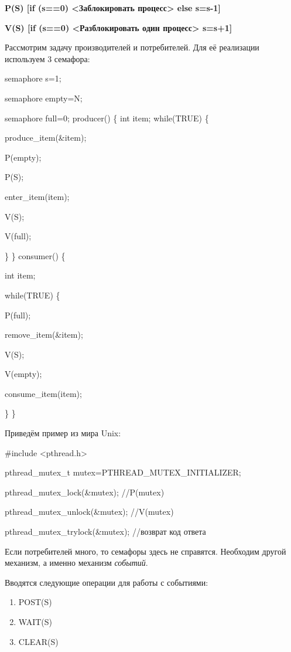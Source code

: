 \documentclass[a4paper,12pt]{article}
\begin{document}
	{\bf {P(S) [if (s==0) <Заблокировать процесс> else s=s-1]}}
	
	{\bf {V(S) [if (s==0) <Разблокировать один процесс> s=s+1]}}
	
	Рассмотрим задачу производителей и потребителей. Для её реализации используем 3 семафора:
	
	{\bf {semaphore s=1;
	
		semaphore empty=N;
		
		semaphore full=0;
	\newline
	\newline
	producer() \{
		int item;
		while(TRUE) \{
		
			\qquad produce\_item(\&item);
			
			\qquad P(empty);
			
			\qquad P(S);
			
			\qquad enter\_item(item);
			
			\qquad V(S);
			
			\qquad V(full);
			
		\}
	\newline		
	\}
	\newline
	consumer() \{
		
		int item;
		
		while(TRUE) \{
			
			\qquad P(full);
			
			\qquad remove\_item(\&item);
			
			\qquad V(S);
			
			\qquad V(empty);
			
			\qquad consume\_item(item);
			
		\}
	\newline	
	\} }}
	
	Приведём пример из мира Unix:
	
	{\bf {\#include <pthread.h>
	
		pthread\_mutex\_t mutex=PTHREAD\_MUTEX\_INITIALIZER;
		
		pthread\_mutex\_lock(\&mutex); //P(mutex)
		
		pthread\_mutex\_unlock(\&mutex); //V(mutex)
		
		pthread\_mutex\_trylock(\&mutex); //возврат код ответа}}
		
	Если потребителей много, то семафоры здесь не справятся. Необходим другой механизм, а 
именно механизм {\em событий}.

	Вводятся следующие операции для работы с событиями:
	\begin{enumerate}
		\item POST(S)
		\item WAIT(S)
		\item CLEAR(S)
	\end{enumerate}
	
\end{document}
